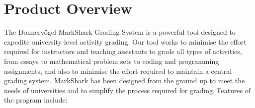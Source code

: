 \documentclass{article}
\begin{document}
\tableofcontents
\clearpage

\section{Product Overview}  %
The Donnervögel MarkShark Grading System is a powerful tool designed to 
expedite university-level activity grading. Our tool works to minimise the effort 
required for instructors and teaching assistants to grade all types of activities, 
from essays to mathematical problem sets to coding and programming assignments,
and also to minimise the effort required to maintain a central grading system.
MarkShark has been designed from the ground up to meet the needs of universities and 
to simplify the process required for grading. Features of the program include:
\end{document}
